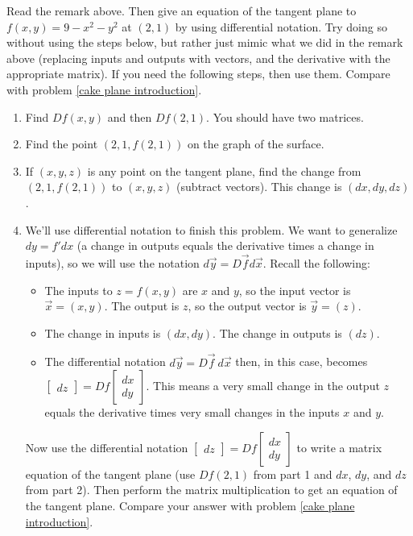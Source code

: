\begin{problem}\label{tangent plane using matrix}%
Read the remark above. Then give an equation of the tangent plane to $f(x,y)=9-x^2-y^2$ at $(2,1)$ by using differential notation. Try doing so without using the steps below, but rather just mimic what we did in the remark above (replacing inputs and outputs with vectors, and the derivative with the appropriate matrix). If you need the following steps, then use them. Compare with problem \ref{cake plane introduction}.
\begin{enumerate}
 \item Find $Df(x,y)$ and then $Df(2,1)$. You should have two matrices.
 \item Find the point $(2,1,f(2,1))$ on the graph of the surface.
 \item If $(x,y,z)$ is any point on the tangent plane, find the change from $(2,1, f(2,1))$ to $(x,y,z)$ (subtract vectors).  This change is $(dx,dy,dz)$.
 \item We'll use differential notation to finish this problem. We want to generalize $dy=f'dx$ (a change in outputs equals the derivative times a change in inputs), so we will use the notation $d\vec y = D\vec fd\vec x$. Recall the following:
\begin{itemize} 
\item  The inputs to $z=f(x,y)$ are $x$ and $y$, so the input vector is $\vec x=(x,y)$.  The output is $z$, so the output vector is $\vec y= (z)$.
\item The change in inputs is $(dx,dy)$.  The change in outputs is $(dz)$. 
\item The differential notation $d\vec y=D\vec f\ d\vec x$ then, in this case, becomes $\begin{bmatrix}dz\end{bmatrix}=Df\begin{bmatrix}dx \\ dy\end{bmatrix}$. This means a very small change in the output $z$ equals the derivative times very small changes in the inputs $x$ and $y$.
\end{itemize}
Now use the differential notation $\begin{bmatrix}dz\end{bmatrix}=Df\begin{bmatrix}dx \\ dy\end{bmatrix}$ to write a matrix equation of the tangent plane (use $Df(2,1)$ from part 1 and $dx$, $dy$, and $dz$ from part 2). Then perform the matrix multiplication to get an equation of the tangent plane. Compare your answer with problem \ref{cake plane introduction}.
\end{enumerate}
\end{problem}

